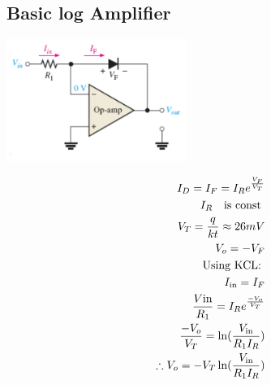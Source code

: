 \documentclass[a4paper, 12pt]{report}
\begin{document}
\begin{center}
\begin{center}
\begin{center}
\begin{center}
\begin{center}
\begin{center}
\begin{center}
\begin{center}
\begin{center}
\begin{center}
\begin{center}
\begin{center}
\begin{multicols}{2}
\subsection{Basic log Amplifier}
\begin{center}
    \includegraphics[width=0.44\textwidth]{figures/26c.jpg}
\end{center}
\begin{equation} \notag
    \begin{align}
    I_D = I_F = I_R e^\frac{V_F}{V_T}\\
    I_R \quad \text{is\ const\ }\\
    V_T = \frac{q}{kt} \approx 26mV\\
    V_o = -V_F\\
    \text{Using\ KCL:\ }\\
    I_\text{in} = I_F\\
    \frac{V\text{in}}{R_1} = I_R e^{\frac{-V_o}{V_T}}\\
    \frac{-V_o}{V_T} = \ln(\frac{V_\text{in}}{R_1I_R})\\
    \therefore V_o = -V_T \ln(\frac{V_\text{in}}{R_1I_R})
    \end{align}
\end{equation}


\end{multicols}
\end{center}
\end{center}
\end{center}
\end{center}
\end{center}
\end{center}
\end{center}
\end{center}
\end{center}
\end{center}
\end{center}
\end{center}
\end{document}
